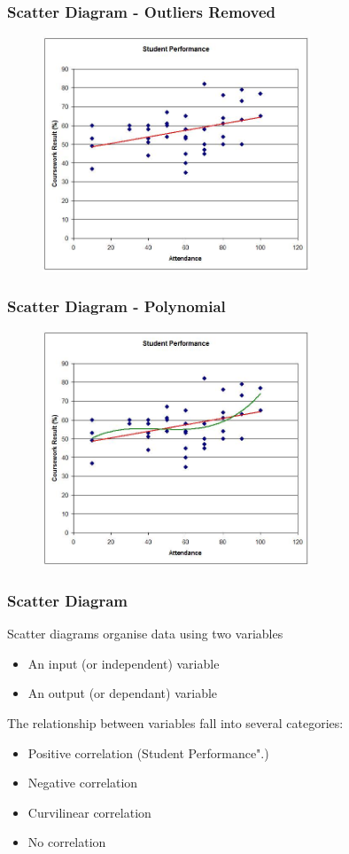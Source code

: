 \begin{frame}
\frametitle{Scatter Diagram - Outliers Removed}
\begin{figure}
	\centering
		\includegraphics[width = 8cm]{images/scattertrend2.jpg}
	\label{fig:studentc}
\end{figure}
\end{frame}






\begin{frame}
\frametitle{Scatter Diagram - Polynomial}
\begin{figure}
	\centering
		\includegraphics[width = 8cm]{images/scattertrend3.jpg}
	\label{fig:studentd}
\end{figure}
\end{frame}




\begin{frame}
\frametitle{Scatter Diagram}
Scatter diagrams organise data using two variables
\begin{itemize}
	\item An input (or independent) variable
	\item An output (or dependant) variable
\end{itemize}
The relationship between variables fall into several categories:
\begin{itemize}
	\item Positive correlation (Student Performance".)
	\item Negative correlation
	\item Curvilinear correlation
	\item No correlation
\end{itemize}
\end{frame}




